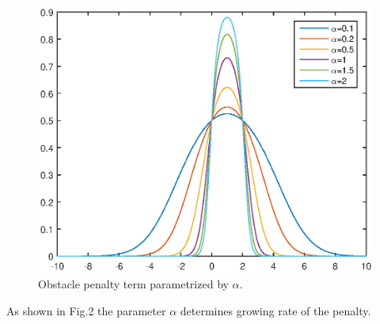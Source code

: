 \documentclass[12pt]{article}
\begin{document}
\begin{figure}[h!]
\begin{centering}
\includegraphics[width=12cm]{./Figures/bell2.eps}
\par\end{centering}
\caption{Obstacle penalty term parametrized by $\alpha$.}
\end{figure}
As shown in Fig.2 the parameter $\alpha$ determines growing rate of the penalty.
\end{document}
